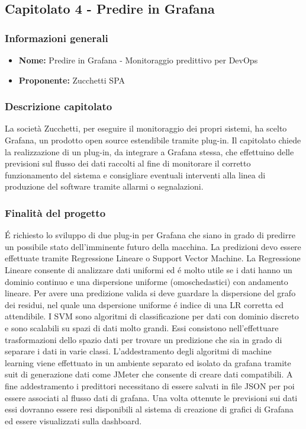 
\subsection{Capitolato 4 - Predire in Grafana}

		\subsubsection{Informazioni generali}
			\begin{itemize} %
			  \item \textbf{Nome:} Predire in Grafana - Monitoraggio predittivo per DevOps
			  \item \textbf{Proponente:} Zucchetti SPA
			\end{itemize}

		\subsubsection{Descrizione capitolato}
			La società Zucchetti, per eseguire il monitoraggio dei propri sistemi, ha scelto Grafana, un prodotto open source estendibile tramite plug-in.
			Il capitolato chiede la realizzazione di un plug-in, da integrare a Grafana stessa, che effettuino delle previsioni sul flusso dei dati raccolti al fine di monitorare il corretto funzionamento del sistema e consigliare eventuali interventi alla linea di produzione del software tramite allarmi o segnalazioni.

		\subsubsection{Finalità del progetto}
			É richiesto lo sviluppo di due plug-in per Grafana che siano in grado di predirre un possibile stato dell'imminente futuro della macchina. La predizioni devo essere effettuate tramite Regressione Lineare o Support Vector Machine.
			La Regressione Lineare consente di analizzare dati uniformi ed é molto utile se i dati hanno un dominio continuo e una dispersione uniforme (omoschedastici) con andamento lineare. Per avere una predizione valida si deve guardare la dispersione del grafo dei residui, nel quale una dspersione uniforme é indice di una LR corretta ed attendibile.
			I SVM sono algoritmi di classificazione per dati con dominio discreto e sono scalabili su spazi di dati molto grandi. Essi consistono nell'effettuare trasformazioni dello spazio dati per trovare un predizione che sia in grado di separare i dati in varie classi.
			L'addestramento degli algoritmi di machine learning viene effettuato in un ambiente separato ed isolato da grafana tramite suit di generazione dati come JMeter che consente di creare dati compatibili. A fine addestramento i predittori necessitano di essere salvati in file JSON per poi essere associati al flusso dati di grafana. Una volta ottenute le previsioni sui dati essi dovranno essere resi disponibili al sistema di creazione di grafici di Grafana ed essere visualizzati sulla dashboard.

